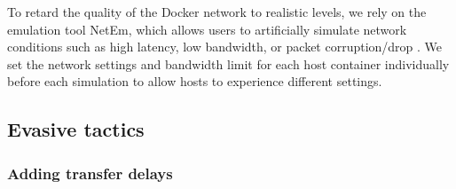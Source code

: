 \documentclass[runningheads,11pt]{llncs}\usepackage[]{graphicx}\usepackage[]{color}
\begin{document}
To retard the quality of the Docker network to realistic levels, we rely on the emulation tool NetEm, which allows users to artificially simulate network conditions such as high latency, low bandwidth, or packet corruption/drop \cite{hemminger2005network}.
We set the network settings and bandwidth limit for each host container individually before each simulation to allow hosts to experience different settings.







\subsection{Evasive tactics}

\subsubsection{Adding transfer delays}\label{Sec:delays_desc}
\end{document}
